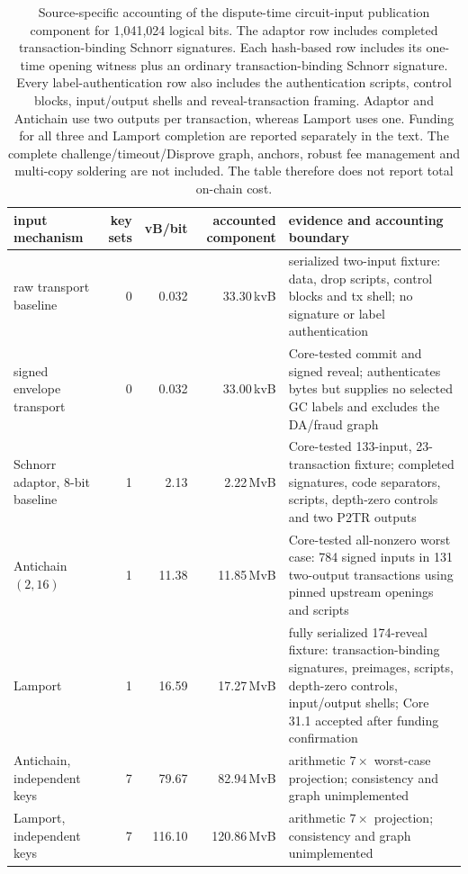 \documentclass[11pt]{article}
\begin{document}
\begin{table}[t!]\centering\scriptsize\setlength{\tabcolsep}{3pt}
\begin{tabularx}{\textwidth}{>{\raggedright\arraybackslash}p{2.25cm}rrr>{\raggedright\arraybackslash}X}\toprule
input mechanism & key sets & vB/bit & accounted component & evidence and accounting boundary\\\midrule
raw transport baseline & 0 & 0.032 & 33.30\,kvB & serialized two-input fixture: data, drop scripts, control blocks and tx shell; no signature or label authentication\\
signed envelope transport~\cite{esspi25} & 0 & 0.032 & 33.00\,kvB & Core-tested commit and signed reveal; authenticates bytes but supplies no selected GC labels and excludes the DA/fraud graph\\
Schnorr adaptor, 8-bit baseline~\cite{bitvm3paper,mosaic26} & 1 & 2.13 & 2.22\,MvB & Core-tested 133-input, 23-transaction fixture; completed signatures, code separators, scripts, depth-zero controls and two P2TR outputs\\
Antichain $(2,16)$~\cite{antichain26} & 1 & 11.38 & 11.85\,MvB & Core-tested all-nonzero worst case: 784 signed inputs in 131 two-output transactions using pinned upstream openings and scripts\\
Lamport & 1 & 16.59 & 17.27\,MvB & fully serialized 174-reveal fixture: transaction-binding signatures, preimages, scripts, depth-zero controls, input/output shells; Core 31.1 accepted after funding confirmation\\
Antichain, independent keys & 7 & 79.67 & 82.94\,MvB & arithmetic $7\times$ worst-case projection; consistency and graph unimplemented\\
Lamport, independent keys & 7 & 116.10 & 120.86\,MvB & arithmetic $7\times$ projection; consistency and graph unimplemented\\\bottomrule
\end{tabularx}
\caption{Source-specific accounting of the dispute-time circuit-input
publication component for 1{,}041{,}024 logical bits. The adaptor row includes
completed transaction-binding Schnorr signatures. Each hash-based row includes
its one-time opening witness plus an ordinary transaction-binding Schnorr
signature. Every label-authentication row also includes the authentication scripts,
control blocks, input/output shells and reveal-transaction framing. Adaptor and
Antichain use two outputs per transaction, whereas Lamport uses one. Funding
for all three and Lamport completion are reported separately in the text. The complete
challenge/timeout/Disprove graph, anchors, robust fee management and multi-copy
soldering are not included. The table therefore does not report total on-chain
cost.}
\label{tab:onchain}
\end{table}
\end{document}

